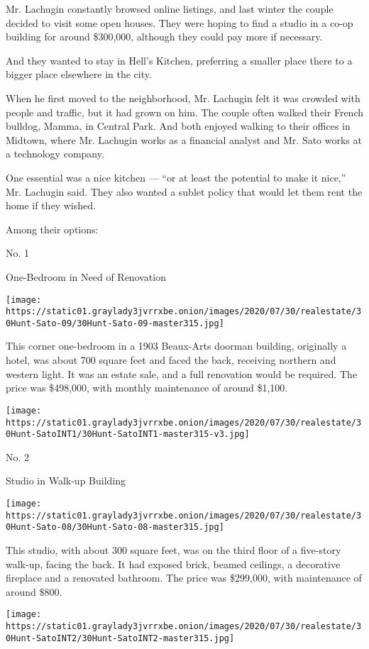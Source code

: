 Mr. Lachugin constantly browsed online listings, and last winter the
couple decided to visit some open houses. They were hoping to find a
studio in a co-op building for around \$300,000, although they could pay
more if necessary.

And they wanted to stay in Hell's Kitchen, preferring a smaller place
there to a bigger place elsewhere in the city.

When he first moved to the neighborhood, Mr. Lachugin felt it was
crowded with people and traffic, but it had grown on him. The couple
often walked their French bulldog, Mamma, in Central Park. And both
enjoyed walking to their offices in Midtown, where Mr. Lachugin works as
a financial analyst and Mr. Sato works at a technology company.

One essential was a nice kitchen --- ``or at least the potential to make
it nice,'' Mr. Lachugin said. They also wanted a sublet policy that
would let them rent the home if they wished.

Among their options:

No. 1

One-Bedroom in Need of Renovation

\texttt{[image: https://static01.graylady3jvrrxbe.onion/images/2020/07/30/realestate/30Hunt-Sato-09/30Hunt-Sato-09-master315.jpg]}

This corner one-bedroom in a 1903 Beaux-Arts doorman building,
originally a hotel, was about 700 square feet and faced the back,
receiving northern and western light. It was an estate sale, and a full
renovation would be required. The price was \$498,000, with monthly
maintenance of around \$1,100.

\texttt{[image: https://static01.graylady3jvrrxbe.onion/images/2020/07/30/realestate/30Hunt-SatoINT1/30Hunt-SatoINT1-master315-v3.jpg]}

No. 2

Studio in Walk-up Building

\texttt{[image: https://static01.graylady3jvrrxbe.onion/images/2020/07/30/realestate/30Hunt-Sato-08/30Hunt-Sato-08-master315.jpg]}

This studio, with about 300 square feet, was on the third floor of a
five-story walk-up, facing the back. It had exposed brick, beamed
ceilings, a decorative fireplace and a renovated bathroom. The price was
\$299,000, with maintenance of around \$800.

\texttt{[image: https://static01.graylady3jvrrxbe.onion/images/2020/07/30/realestate/30Hunt-SatoINT2/30Hunt-SatoINT2-master315.jpg]}

